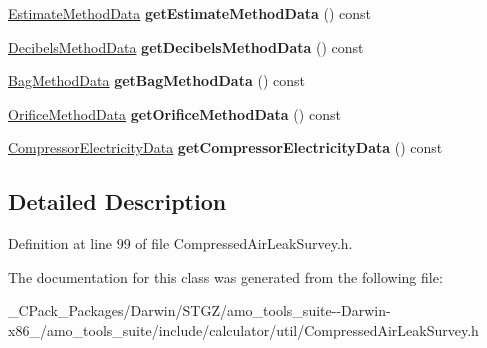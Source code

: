 \begin{DoxyCompactItemize}
\mbox{\label{class_compressed_air_leak_survey_input_a46f6c8e7b71d4f53255b66f49ce9fc12}} 
\hyperlink{class_estimate_method_data}{Estimate\+Method\+Data} {\bfseries get\+Estimate\+Method\+Data} () const
\item 
\mbox{\label{class_compressed_air_leak_survey_input_ad1085ebe92eeb55a76214d272f1d024f}} 
\hyperlink{class_decibels_method_data}{Decibels\+Method\+Data} {\bfseries get\+Decibels\+Method\+Data} () const
\item 
\mbox{\label{class_compressed_air_leak_survey_input_a2bd9317c8f38903db0d013e5e54b9acf}} 
\hyperlink{class_bag_method_data}{Bag\+Method\+Data} {\bfseries get\+Bag\+Method\+Data} () const
\item 
\mbox{\label{class_compressed_air_leak_survey_input_ad4abb9606753288d97032067cd5bfba0}} 
\hyperlink{class_orifice_method_data}{Orifice\+Method\+Data} {\bfseries get\+Orifice\+Method\+Data} () const
\item 
\mbox{\label{class_compressed_air_leak_survey_input_abb548b44e689a5aae7ffe4ab3acb2234}} 
\hyperlink{class_compressor_electricity_data}{Compressor\+Electricity\+Data} {\bfseries get\+Compressor\+Electricity\+Data} () const
\end{DoxyCompactItemize}


\subsection{Detailed Description}


Definition at line 99 of file Compressed\+Air\+Leak\+Survey.\+h.



The documentation for this class was generated from the following file\+:\begin{DoxyCompactItemize}
\item 
\+\_\+\+C\+Pack\+\_\+\+Packages/\+Darwin/\+S\+T\+G\+Z/amo\+\_\+tools\+\_\+suite-\/-\/\+Darwin-\/x86\+\_/amo\+\_\+tools\+\_\+suite/include/calculator/util/Compressed\+Air\+Leak\+Survey.\+h\end{DoxyCompactItemize}
